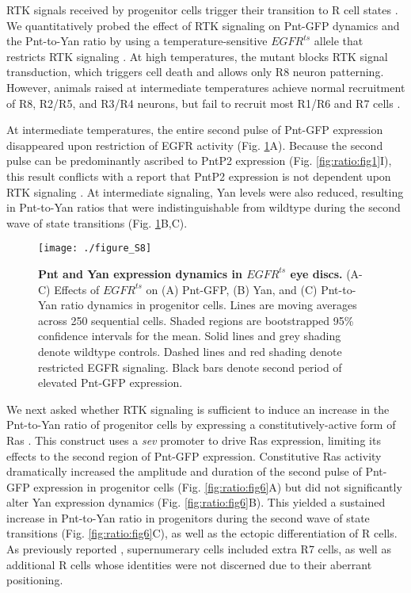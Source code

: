 RTK signals received by progenitor cells trigger their transition to R cell states \cite{Freeman1996}. We quantitatively probed the effect of RTK signaling on Pnt-GFP dynamics and the Pnt-to-Yan ratio by using a temperature-sensitive $EGFR^{ts}$ allele that restricts RTK signaling \cite{Kumar1998}. At high temperatures, the mutant blocks RTK signal transduction, which triggers cell death and allows only R8 neuron patterning. However, animals raised at intermediate temperatures achieve normal recruitment of R8, R2/R5, and R3/R4 neurons, but fail to recruit most R1/R6 and R7 cells \cite{Pelaez2015a}.

At intermediate temperatures, the entire second pulse of Pnt-GFP expression disappeared upon restriction of EGFR activity (Fig. \ref{fig:ratio:figS8}A). Because the second pulse can be predominantly ascribed to PntP2 expression (Fig. \ref{fig:ratio:fig1}I), this result conflicts with a report that PntP2 expression is not dependent upon RTK signaling \cite{Shwartz2013}. At intermediate signaling, Yan levels were also reduced, resulting in Pnt-to-Yan ratios that were indistinguishable from wildtype during the second wave of state transitions (Fig. \ref{fig:ratio:figS8}B,C).

\begin{figure}[h]
\centering
\texttt{[image: ./figure\_S8]}
\caption[Pnt and Yan expression dynamics in $EGFR^{ts}$ eye discs.]{\textbf{Pnt and Yan expression dynamics in $EGFR^{ts}$ eye discs.} (A-C) Effects of $EGFR^{ts}$ on (A) Pnt-GFP, (B) Yan, and (C) Pnt-to-Yan ratio dynamics in progenitor cells. Lines are moving averages across 250 sequential cells. Shaded regions are bootstrapped 95\% confidence intervals for the mean. Solid lines and grey shading denote wildtype controls. Dashed lines and red shading denote restricted EGFR signaling. Black bars denote second period of elevated Pnt-GFP expression.}
\label{fig:ratio:figS8}
\end{figure}

We next asked whether RTK signaling is sufficient to induce an increase in the Pnt-to-Yan ratio of progenitor cells by expressing a constitutively-active form of Ras \cite{Simon1991,Fortini1992}. This construct uses a \textit{sev} promoter to drive Ras expression, limiting its effects to the second region of Pnt-GFP expression. Constitutive Ras activity dramatically increased the amplitude and duration of the second pulse of Pnt-GFP expression in progenitor cells (Fig. \ref{fig:ratio:fig6}A) but did not significantly alter Yan expression dynamics (Fig. \ref{fig:ratio:fig6}B). This yielded a sustained increase in Pnt-to-Yan ratio in progenitors during the second wave of state transitions (Fig. \ref{fig:ratio:fig6}C), as well as the ectopic differentiation of R cells. As previously reported \cite{Fortini1992}, supernumerary cells included extra R7 cells, as well as additional R cells whose identities were not discerned due to their aberrant positioning.

